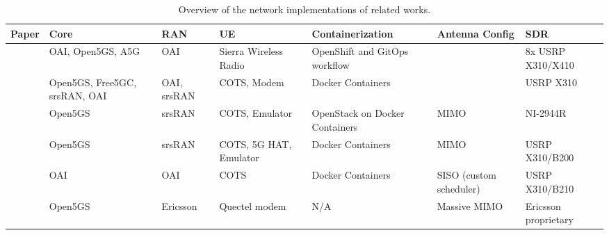 \begin{table}[htbp]
\centering
\footnotesize
\begin{tabularx}{\textwidth}{|p{0.9cm}|p{1.3cm}|p{1.3cm}|p{1.6cm}|X|p{1.5cm}|p{2.3cm}|}
\hline
\rowcolor{gray!30} 
\textbf{Paper} & \textbf{Core} & \textbf{RAN} & \textbf{UE} & \textbf{Containerization} & \textbf{Antenna Config} & \textbf{SDR} \\ \hline
\cite{bonati2025_5gct} & \gls{OAI}, Open5GS, A5G & \gls{OAI} & Sierra Wireless Radio & OpenShift and GitOps workflow & & 8x USRP X310/X410 \\ \hline
\cite{horstmann2025open5gcube} & Open5GS, Free5GC, srsRAN, \gls{OAI} & \gls{OAI}, srsRAN & COTS, Modem & Docker Containers &  & USRP X310 \\ \hline
\cite{mamushiane2023deploying} & Open5GS & srsRAN & COTS, Emulator & OpenStack on Docker Containers & MIMO & NI-2944R \\ \hline
\cite{tio2025exploring5g} & Open5GS & srsRAN & COTS, 5G HAT, Emulator & Docker Containers & MIMO & USRP X310/B200 \\ \hline
\cite{vazquez2024maq5g} & \gls{OAI} & \gls{OAI} & \gls{COTS} & Docker Containers & SISO (custom scheduler) & USRP X310/B210 \\ \hline
\cite{zu2025realworld} & Open5GS & Ericsson & Quectel modem & N/A & Massive MIMO & Ericsson proprietary\\ \hline
\end{tabularx}
\caption{Overview of the network implementations of related works.}
\label{tab:related_works_comparison}
\end{table}